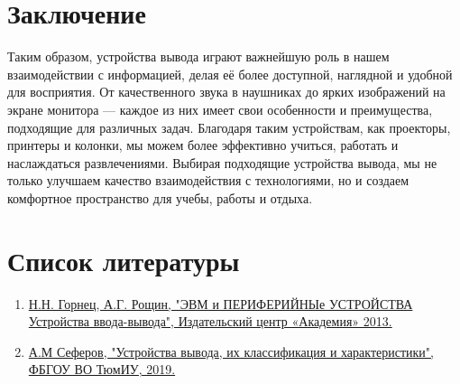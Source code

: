 \documentclass[14pt]{extreport}
\begin{document}
    \chapter{Заключение}
    Таким образом, устройства вывода играют важнейшую роль в нашем взаимодействии с информацией, делая её более доступной, наглядной и удобной для восприятия. От качественного звука в наушниках до ярких изображений на экране монитора — каждое из них имеет свои особенности и преимущества, подходящие для различных задач. Благодаря таким устройствам, как проекторы, принтеры и колонки, мы можем более эффективно учиться, работать и наслаждаться развлечениями. Выбирая подходящие устройства вывода, мы не только улучшаем качество взаимодействия с технологиями, но и создаем комфортное пространство для учебы, работы и отдыха.
    
    \chapter{Список литературы}
    \begin{enumerate}
    \item \href{https://academia-moscow.ru/ftp_share/_books/fragments/fragment_19864.pdf}{Н.Н. Горнец, А.Г. Рощин, "ЭВМ и ПЕРИФЕРИЙНЫе УСТРОЙСТВА \\ Устройства ввода-вывода", Издательский центр «Академия» 2013.}
    \item  \href{https://scienceforum.ru/2019/article/2018010779}{А.М Сеферов, "Устройства вывода, их классификация и характеристики", ФБГОУ ВО ТюмИУ, 2019.}
    \end{enumerate}
\end{document}
